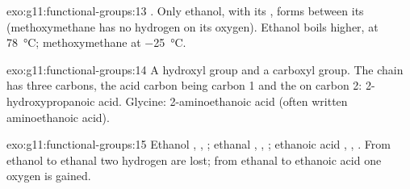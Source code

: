 \begin{solution}{exo:g11:functional-groups:13}
. Only ethanol, with its , forms 
between its  (methoxymethane has no hydrogen on its oxygen).
Ethanol boils higher, at \qty{78}{\celsius}; methoxymethane at
\qty{-25}{\celsius}.
\end{solution}

\begin{solution}{exo:g11:functional-groups:14}
A hydroxyl group and a carboxyl group. The chain has three carbons, the
acid carbon being carbon 1 and the  on carbon 2:
2-hydroxypropanoic acid. Glycine: 2-aminoethanoic acid (often written
aminoethanoic acid).
\end{solution}

\begin{solution}{exo:g11:functional-groups:15}
Ethanol , , ; ethanal ,
, ; ethanoic acid , ,
. From ethanol to ethanal two hydrogen  are lost;
from ethanal to ethanoic acid one oxygen  is gained.
\end{solution}

